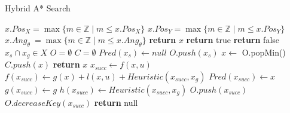 \begin{algorithm}
    \caption{Hybrid A* Search}\label{alg:HA*}
    \begin{algorithmic}[1]
            \State $x.Pos_X = \max\{m\in\mathbb{Z}\mid m\le x.Pos_X\}$
            \State $x.Pos_Y = \max\{m\in\mathbb{Z}\mid m\le x.Pos_Y\}$
            \State $x.Ang_\theta\ =\max\{m\in\mathbb{Z}\mid m\le x.Ang_\theta\}$
            \State \textbf{return} $x$
        \EndFunction
        \Statex
                \State \textbf{return} true
            \Else
                \State \textbf{return} false
            \EndIf
        \EndFunction
        \Statex
        \Require $x_s \cap x_g \in X$
        \State $O = \emptyset$ \label{alg:HA*start}
        \State $C = \emptyset$
        \State $Pred(x_s) \gets null$
        \State $O.push(x_s)$
         \label{alg:HA*while}
            \State $x \gets$ O.popMin()
            \State $C.push(x)$
             \label{alg:HA*solution}
                \State \textbf{return} $x$
            \Else
                \State $x_{succ} \gets f(x,u)$\label{alg:HA*successor}
                        \State $f(x_{succ}) \gets g(x) + l(x,u) + Heuristic(x_{succ}, x_g)$
                            \State $Pred(x_{succ}) \gets x$
                            \State $g(x_{succ}) \gets g$
                            \State $h(x_{succ}) \gets Heuristic(x_{succ}, x_g)$
                                \State $O.push(x_{succ})$
                            \Else
                                \State $O.decreaseKey(x_{succ})$
                            \EndIf
                        \EndIf
                    \EndIf
                \EndFor
            \EndIf
        \EndWhile
        \State \textbf{return} null
    \end{algorithmic}
\end{algorithm}